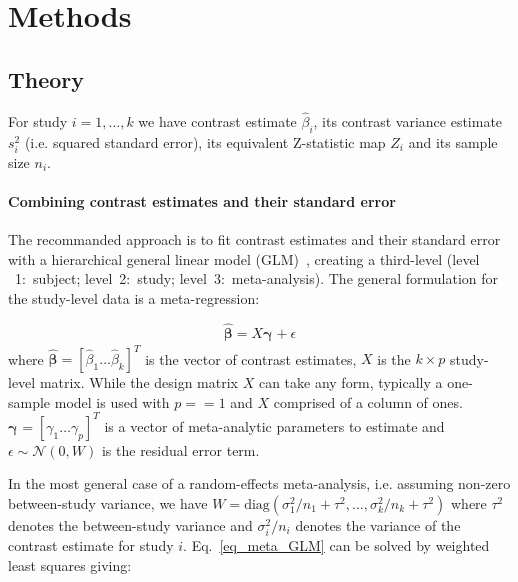 \documentclass[preprint]{elsarticle}
\newcommand{\effectvector}{\hat\beta}
\newcommand{\effect}[1][i]{\effectvector_{#1}}
\newcommand{\vareffect}[1][i]{s^2_{#1}}
\newcommand{\nStudies}{k}
\newcommand{\studyidx}{i}
\newcommand{\metaanalyticeffects}{\vec{\metaanalyticeffect[]}}
\newcommand{\metaanalyticeffect}[1][i]{\gamma_{#1}}
\newcommand{\nMetaAnalyticEffects}{p}
\newcommand{\varBetween}{\tau^2}
\newcommand{\nSubjects}[1][i]{n_{#1}}
\newcommand{\varWithinCon}[1][i]{\sigma^2_{#1} / \nSubjects[#1]}
\newcommand{\transpose}{^T}
\renewcommand{\vec}[1]{\boldsymbol{\mathbf{#1}}}
\begin{document}
\section{Methods}\label{sec:methods}


\subsection{Theory}
For study $\studyidx=1,\ldots,\nStudies$ we have contrast estimate $\effect$, its contrast variance estimate $\vareffect$ (i.e. squared standard error), its equivalent Z-statistic map $Z_i$ and its sample size $n_i$.  

\paragraph{Combining contrast estimates and their standard error}

The recommanded approach is to fit contrast estimates and their standard error with a hierarchical general linear model (GLM)~\cite{Cummings2004}, creating a third-level (level ~1:~subject; level~2:~study; level~3:~meta-analysis). The general formulation for the study-level data is a meta-regression:

\begin{equation}
	\vec{\effectvector} = X \metaanalyticeffects + \epsilon
	\label{eq_meta_GLM}
\end{equation}
where $\vec{\effectvector} = [\effect[1] \ldots \effect[\nStudies] ]\transpose$ is the vector of contrast estimates, $X$ is the $\nStudies \times \nMetaAnalyticEffects$ study-level matrix. While the design matrix $X$ can take any form, typically a one-sample model is used with $\nMetaAnalyticEffects==1$ and $X$ comprised of a column of ones. $\metaanalyticeffects  = [\metaanalyticeffect[1] \ldots \metaanalyticeffect[\nMetaAnalyticEffects] ]\transpose$ is a vector of meta-analytic parameters to estimate and $\epsilon \sim \mathcal{N}(0,W)$ is the residual error term. 

In the most general case of a random-effects meta-analysis, i.e. assuming non-zero between-study variance, we have $W = \mathrm{diag}( \varWithinCon[1] + \varBetween, \ldots ,\varWithinCon[\nStudies] + \varBetween )$ where $\varBetween$ denotes the between-study variance and $\varWithinCon$ denotes the variance of the contrast estimate for study $i$. Eq.~\eqref{eq_meta_GLM} can be solved by weighted least squares giving:
\end{document}
